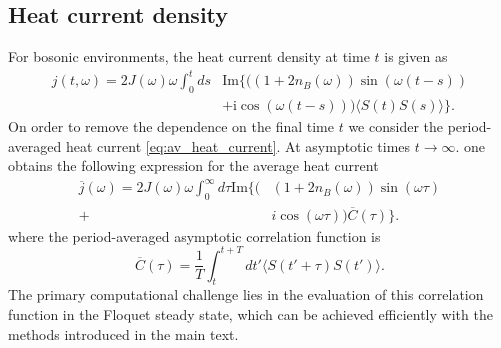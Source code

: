 \documentclass[aps,prb, twocolumn,superscriptaddress]{revtex4-2}
\newcommand{\ii}{\mathrm{i}}
\begin{document}
\subsection{Heat current density}

For bosonic environments, the heat current density at time $t$ is given as \cite{Gribben2022Oct, albarelli2024Pseudomode}
\begin{equation}\label{eq:heat_current}
\begin{split}
    j(t, \omega) = 2J(\omega)\omega \int_{0}^t ds& \mathrm{Im} \{ ((1+2n_B(\omega))\sin(\omega (t-s))\\
                   & + \ii \cos(\omega (t-s))) \langle S(t)S(s)\rangle\}.
\end{split}
\end{equation}
On order to remove the dependence on the final time $t$ we consider the period-averaged heat current \eqref{eq:av_heat_current}. At asymptotic times $t\rightarrow\infty$.
one obtains the following expression for the average heat current
\begin{equation}\label{eq:av_heat_current_expl}
\begin{split}
    \overline{j}(\omega)={2J(\omega)\omega} \int_0^\infty d\tau \mathrm{Im} \{ (&(1+2n_B(\omega))\sin(\omega \tau) \\
    +& i \cos(\omega \tau)) \overline{C}(\tau)\}.
\end{split}
\end{equation}
where the period-averaged asymptotic correlation function is
\begin{equation}
    \overline{C}(\tau)  =\frac{1}{T} \int_{t}^{t+T} dt'\langle S(t'+\tau)S(t')\rangle.
\end{equation}
The primary computational challenge lies in the evaluation of this correlation function in the Floquet steady state, which can be achieved efficiently with the methods introduced in the main text.
\end{document}
